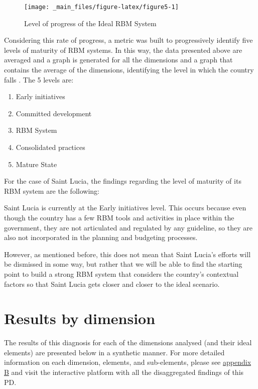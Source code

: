 \documentclass[
  10pt,
]{book}
\providecommand{\tightlist}{%
  \setlength{\itemsep}{0pt}\setlength{\parskip}{0pt}}
\begin{document}
\begin{figure}

{\centering \texttt{[image: \_main\_files/figure-latex/figure5-1]} 

}

\caption{Level of progress of the Ideal RBM System}\label{fig:figure5}
\end{figure}

Considering this rate of progress, a metric was built to progressively identify five levels of maturity of RBM systems. In this way, the data presented above are averaged and a graph is generated for all the dimensions and a graph that contains the average of the dimensions, identifying the level in which the country falls . The 5 levels are:

\begin{enumerate}
\def\labelenumi{\arabic{enumi}.}
\tightlist
\item
  Early initiatives
\item
  Committed development
\item
  RBM System
\item
  Consolidated practices
\item
  Mature State
\end{enumerate}

For the case of Saint Lucia, the findings regarding the level of maturity of its RBM system are the following:

Saint Lucia is currently at the Early initiatives level. This occurs because even though the country has a few RBM tools and activities in place within the government, they are not articulated and regulated by any guideline, so they are also not incorporated in the planning and budgeting processes.

However, as mentioned before, this does not mean that Saint Lucia's efforts will be dismissed in some way, but rather that we will be able to find the starting point to build a strong RBM system that considers the country's contextual factors so that Saint Lucia gets closer and closer to the ideal scenario.

\hypertarget{results-by-dimension}{%
\section{Results by dimension}\label{results-by-dimension}}

The results of this diagnosis for each of the dimensions analysed (and their ideal elements) are presented below in a synthetic manner. For more detailed information on each dimension, elements, and sub-elements, please see \protect\hyperlink{appendixB}{appendix B} and visit the interactive platform with all the disaggregated findings of this PD.
\end{document}
